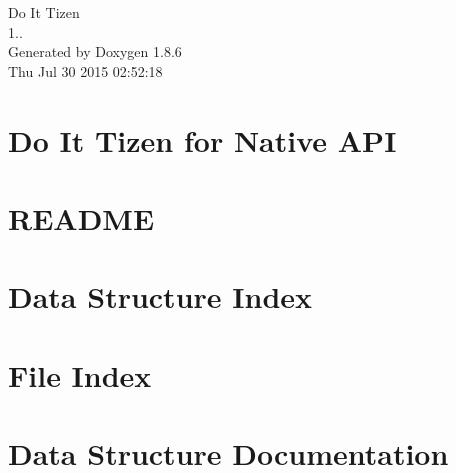 \documentclass[twoside]{book}
\newcommand{\clearemptydoublepage}{%
  \newpage{\pagestyle{empty}\cleardoublepage}%
}
\begin{document}
\hypersetup{pageanchor=false}
\begin{titlepage}
\vspace*{7cm}
\begin{center}%
{\Large Do It Tizen \\[1ex]\large 1.. }\\
\vspace*{1cm}
{\large Generated by Doxygen 1.8.6}\\
\vspace*{0.5cm}
{\small Thu Jul 30 2015 02:52:18}\\
\end{center}
\end{titlepage}
\clearemptydoublepage
\tableofcontents
\clearemptydoublepage
{}
\hypersetup{pageanchor=true}

\chapter{Do It Tizen for Native A\-P\-I}
\label{index}\hypertarget{index}{}
\chapter{R\-E\-A\-D\-M\-E}
\label{d6/d13/md__Users_CDJ_Dropbox_DJ_SSM_DIT_README}
\hypertarget{d6/d13/md__Users_CDJ_Dropbox_DJ_SSM_DIT_README}{}

\chapter{Data Structure Index}

\chapter{File Index}

\chapter{Data Structure Documentation}


































\end{document}
